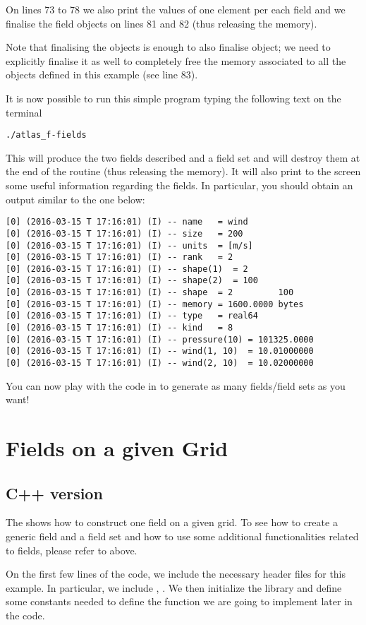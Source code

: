 On lines 73 to 78 we also print the values of one element 
per each field and we finalise the field objects on lines 
81 and 82 (thus releasing the memory).

Note that finalising the  objects 
is enough to also finalise  object;
we need to explicitly finalise it as well to completely 
free the memory associated to all the objects defined 
in this example (see line 83).

It is now possible to run this simple program typing
the following text on the terminal
%
\begin{lstlisting}[style=BashStyle]
./atlas_f-fields
\end{lstlisting}
% 
This will produce the two fields described and a field 
set and will destroy them at the end of the routine 
(thus releasing the memory). It will also print to 
the screen some useful information regarding the fields.
In particular, you should obtain an output similar to 
the one below:
%
\begin{lstlisting}[style=BashStyle]
[0] (2016-03-15 T 17:16:01) (I) -- name   = wind
[0] (2016-03-15 T 17:16:01) (I) -- size   = 200
[0] (2016-03-15 T 17:16:01) (I) -- units  = [m/s]
[0] (2016-03-15 T 17:16:01) (I) -- rank   = 2
[0] (2016-03-15 T 17:16:01) (I) -- shape(1)  = 2
[0] (2016-03-15 T 17:16:01) (I) -- shape(2)  = 100
[0] (2016-03-15 T 17:16:01) (I) -- shape  = 2         100
[0] (2016-03-15 T 17:16:01) (I) -- memory = 1600.0000 bytes
[0] (2016-03-15 T 17:16:01) (I) -- type   = real64
[0] (2016-03-15 T 17:16:01) (I) -- kind   = 8
[0] (2016-03-15 T 17:16:01) (I) -- pressure(10) = 101325.0000
[0] (2016-03-15 T 17:16:01) (I) -- wind(1, 10)  = 10.01000000
[0] (2016-03-15 T 17:16:01) (I) -- wind(2, 10)  = 10.02000000
\end{lstlisting}
% 
You can now play with the code in  
to generate as many fields/field sets as you want! 




\section{Fields on a given Grid}
\label{sect:grid-fields}

\subsection{C++ version}
The  shows how to construct one field
on a given grid. To see how to create a generic field and 
a field set and how to use some additional functionalities 
related to fields, please refer to 
above. 
%

%
On the first few lines of the code, we include the necessary 
header files for this example. In particular, we include 
, . We then initialize the \Atlas library 
and define some constants needed to define the function 
we are going to implement later in the code. 

